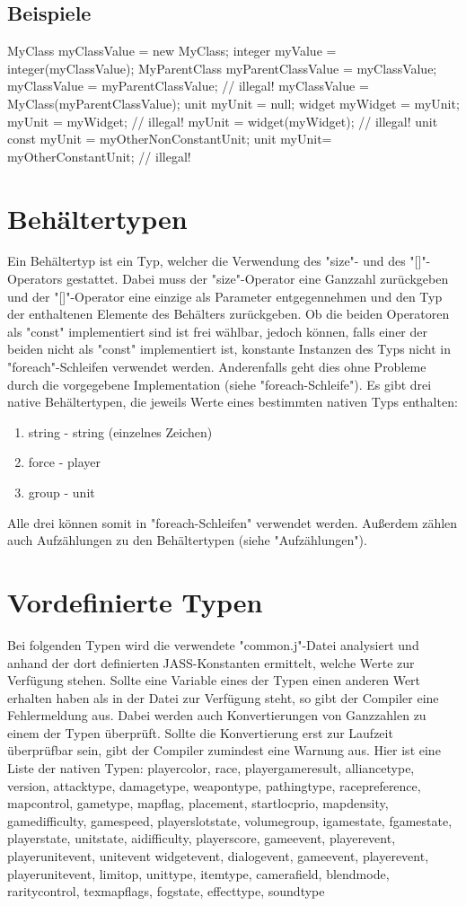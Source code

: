 \subsection{Beispiele}
MyClass myClassValue = new MyClass;
integer myValue = integer(myClassValue);
MyParentClass myParentClassValue = myClassValue;
myClassValue = myParentClassValue; // illegal!
myClassValue = MyClass(myParentClassValue);
unit myUnit = null;
widget myWidget = myUnit;
myUnit = myWidget; // illegal!
myUnit = widget(myWidget); // illegal!
unit const myUnit = myOtherNonConstantUnit;
unit myUnit= myOtherConstantUnit; // illegal!

\section{Behältertypen}
Ein Behältertyp ist ein Typ, welcher die Verwendung des "size"- und des "[]"-Operators gestattet.
Dabei muss der "size"-Operator eine Ganzzahl zurückgeben und der "[]"-Operator eine einzige als
Parameter entgegennehmen und den Typ der enthaltenen Elemente des Behälters zurückgeben.
Ob die beiden Operatoren als "const" implementiert sind ist frei wählbar, jedoch können, falls
einer der beiden nicht als "const" implementiert ist, konstante Instanzen des Typs nicht in
"foreach"-Schleifen verwendet werden.
Anderenfalls geht dies ohne Probleme durch die vorgegebene Implementation (siehe "foreach-Schleife").
Es gibt drei native Behältertypen, die jeweils Werte eines bestimmten nativen Typs enthalten:
\begin{enumerate}
\item string - string (einzelnes Zeichen)
\item force - player
\item group - unit
\end{enumerate}

Alle drei können somit in "foreach-Schleifen" verwendet werden.
Außerdem zählen auch Aufzählungen zu den Behältertypen (siehe "Aufzählungen").

\section{Vordefinierte Typen}
Bei folgenden Typen wird die verwendete "common.j"-Datei analysiert und anhand der dort definierten JASS-Konstanten
ermittelt, welche Werte zur Verfügung stehen. Sollte eine Variable eines der Typen einen anderen Wert erhalten
haben als in der Datei zur Verfügung steht, so gibt der Compiler eine Fehlermeldung aus.
Dabei werden auch Konvertierungen von Ganzzahlen zu einem der Typen überprüft. Sollte die Konvertierung erst zur
Laufzeit überprüfbar sein, gibt der Compiler zumindest eine Warnung aus.
Hier ist eine Liste der nativen Typen:
playercolor, race, playergameresult, alliancetype, version, attacktype, damagetype, weapontype, pathingtype, racepreference,
mapcontrol, gametype, mapflag, placement, startlocprio, mapdensity, gamedifficulty, gamespeed, playerslotstate, volumegroup,
igamestate, fgamestate, playerstate, unitstate, aidifficulty, playerscore, gameevent, playerevent, playerunitevent, unitevent
widgetevent, dialogevent, gameevent, playerevent, playerunitevent, limitop, unittype, itemtype, camerafield, blendmode, raritycontrol,
texmapflags, fogstate, effecttype, soundtype 